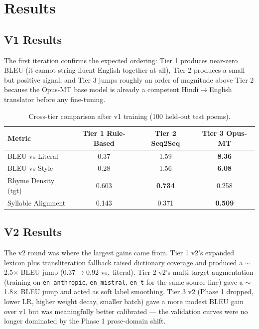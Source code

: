\documentclass[11pt]{article}
\begin{document}
\section{Results}

\subsection{V1 Results}
The first iteration confirms the expected ordering: Tier 1 produces near-zero BLEU (it cannot string fluent English together at all), Tier 2 produces a small but positive signal, and Tier 3 jumps roughly an order of magnitude above Tier 2 because the Opus-MT base model is already a competent Hindi$\rightarrow$English translator before any fine-tuning.

\begin{table}[h]
\centering
\caption{Cross-tier comparison after v1 training (100 held-out test poems).}
\label{tab:v1}
\begin{tabular}{lccc}
\toprule
\textbf{Metric} & \textbf{Tier 1 Rule-Based} & \textbf{Tier 2 Seq2Seq} & \textbf{Tier 3 Opus-MT} \\
\midrule
BLEU vs Literal       & 0.37  & 1.59  & \textbf{8.36} \\
BLEU vs Style         & 0.28  & 1.56  & \textbf{6.08} \\
Rhyme Density (tgt)   & 0.603 & \textbf{0.734} & 0.258 \\
Syllable Alignment    & 0.143 & 0.371 & \textbf{0.509} \\
\bottomrule
\end{tabular}
\end{table}

\subsection{V2 Results}
The v2 round was where the largest gains came from. Tier 1 v2's expanded lexicon plus transliteration fallback raised dictionary coverage and produced a $\sim$2.5$\times$ BLEU jump (0.37$\rightarrow$0.92 vs.\ literal). Tier 2 v2's multi-target augmentation (training on \texttt{en\_anthropic}, \texttt{en\_mistral}, \texttt{en\_t} for the same source line) gave a $\sim$1.8$\times$ BLEU jump and acted as soft label smoothing. Tier 3 v2 (Phase 1 dropped, lower LR, higher weight decay, smaller batch) gave a more modest BLEU gain over v1 but was meaningfully better calibrated --- the validation curves were no longer dominated by the Phase 1 prose-domain shift.
\end{document}
